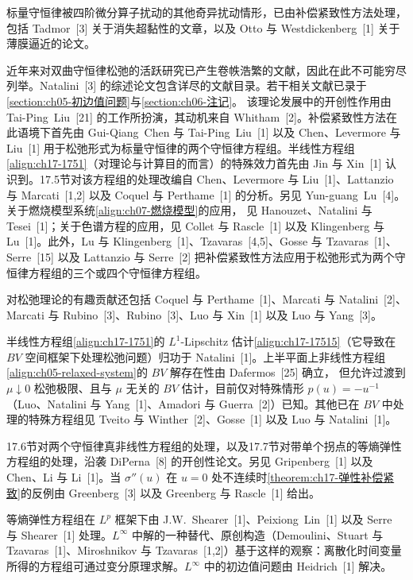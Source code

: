 \documentclass[../../main.tex]{subfiles}
\begin{document}
标量守恒律被四阶微分算子扰动的其他奇异扰动情形，已由补偿紧致性方法处理，包括 Tadmor~[3] 关于消失超黏性的文章，以及 Otto 与 Westdickenberg~[1] 关于薄膜逼近的论文。

近年来对双曲守恒律松弛的活跃研究已产生卷帙浩繁的文献，因此在此不可能穷尽列举。Natalini~[3] 的综述论文包含详尽的文献目录。若干相关文献已录于\cref{section:ch05-初边值问题}与\cref{section:ch06-注记}。
该理论发展中的开创性作用由 Tai-Ping~Liu~[21] 的工作所扮演，其动机来自 Whitham~[2]。补偿紧致性方法在此语境下首先由 Gui-Qiang~Chen 与 Tai-Ping~Liu~[1] 以及 Chen、Levermore 与 Liu~[1] 用于松弛形式为标量守恒律的两个守恒律方程组。半线性方程组\eqref{align:ch17-1751}（对理论与计算目的而言）的特殊效力首先由 Jin 与 Xin~[1] 认识到。17.5节对该方程组的处理改编自 Chen、Levermore 与 Liu~[1]、Lattanzio 与 Marcati~[1,2] 以及 Coquel 与 Perthame~[1] 的分析。另见 Yun-guang~Lu~[4]。关于燃烧模型系统\eqref{align:ch07-燃烧模型}的应用，
见 Hanouzet、Natalini 与 Tesei~[1]；关于色谱方程的应用，见 Collet 与 Rascle~[1] 以及 Klingenberg 与 Lu~[1]。此外，Lu 与 Klingenberg~[1]、Tzavaras~[4,5]、Gosse 与 Tzavaras~[1]、Serre~[15] 以及 Lattanzio 与 Serre~[2] 把补偿紧致性方法应用于松弛形式为两个守恒律方程组的三个或四个守恒律方程组。

对松弛理论的有趣贡献还包括 Coquel 与 Perthame~[1]、Marcati 与 Natalini~[2]、Marcati 与 Rubino~[3]、Rubino~[3]、Luo 与 Xin~[1] 以及 Luo 与 Yang~[3]。

半线性方程组\eqref{align:ch17-1751}的 $L^1$-Lipschitz 估计\eqref{align:ch17-17515}（它导致在 $BV$ 空间框架下处理松弛问题）归功于 Natalini~[1]。上半平面上非线性方程组\eqref{align:ch05-relaxed-system}的 $BV$ 解存在性由 Dafermos~[25] 确立，
但允许过渡到 $\mu\downarrow0$ 松弛极限、且与 $\mu$ 无关的 $BV$ 估计，目前仅对特殊情形 $p(u)=-u^{-1}$（Luo、Natalini 与 Yang~[1]、Amadori 与 Guerra~[2]）已知。其他已在 $BV$ 中处理的特殊方程组见 Tveito 与 Winther~[2]、Gosse~[1] 以及 Luo 与 Natalini~[1]。

17.6节对两个守恒律真非线性方程组的处理，以及17.7节对带单个拐点的等熵弹性方程组的处理，沿袭 DiPerna~[8] 的开创性论文。另见 Gripenberg~[1] 以及 Chen、Li 与 Li~[1]。当 $\sigma''(u)$ 在 $u=0$ 处不连续时\cref{theorem:ch17-弹性补偿紧致}的反例由 Greenberg~[3] 以及 Greenberg 与 Rascle~[1] 给出。

等熵弹性方程组在 $L^p$ 框架下由 J.W.~Shearer~[1]、Peixiong~Lin~[1] 以及 Serre 与 Shearer~[1] 处理。$L^\infty$ 中解的一种替代、原创构造（Demoulini、Stuart 与 Tzavaras~[1]、Miroshnikov 与 Tzavaras~[1,2]）基于这样的观察：离散化时间变量所得的方程组可通过变分原理求解。$L^\infty$ 中的初边值问题由 Heidrich~[1] 解决。
\end{document}
